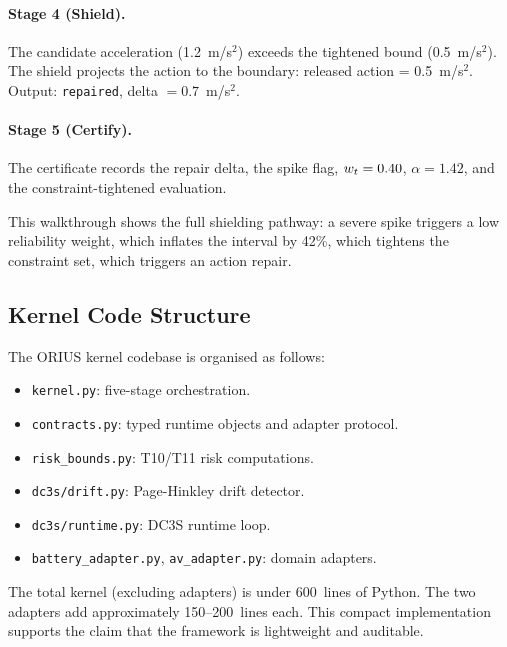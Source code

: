\paragraph{Stage 4 (Shield).}
The candidate acceleration (1.2~m/s$^2$) exceeds the tightened bound (0.5~m/s$^2$).
The shield projects the action to the boundary: released action = 0.5~m/s$^2$.
Output: \texttt{repaired}, delta $= 0.7$~m/s$^2$.

\paragraph{Stage 5 (Certify).}
The certificate records the repair delta, the spike flag, $w_t = 0.40$,
$\alpha = 1.42$, and the constraint-tightened evaluation.

This walkthrough shows the full shielding pathway: a severe spike triggers a low
reliability weight, which inflates the interval by 42\%, which tightens the constraint
set, which triggers an action repair.

\subsection{Kernel Code Structure}

The ORIUS kernel codebase is organised as follows:

\begin{itemize}[nosep,leftmargin=*]
  \item \texttt{kernel.py}: five-stage orchestration.
  \item \texttt{contracts.py}: typed runtime objects and adapter protocol.
  \item \texttt{risk\_bounds.py}: T10/T11 risk computations.
  \item \texttt{dc3s/drift.py}: Page-Hinkley drift detector.
  \item \texttt{dc3s/runtime.py}: DC3S runtime loop.
  \item \texttt{battery\_adapter.py}, \texttt{av\_adapter.py}: domain adapters.
\end{itemize}

The total kernel (excluding adapters) is under 600~lines of Python.  The two adapters
add approximately 150--200~lines each.  This compact implementation supports the claim
that the framework is lightweight and auditable.
